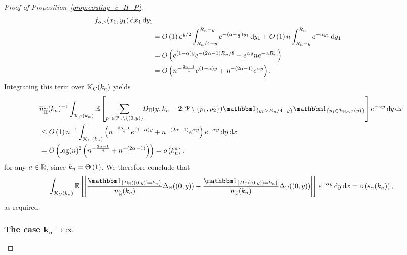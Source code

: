 \begin{proof}[Proof of Proposition~\ref{prop:couling_c_H_P}]
\begin{align*}
		f_{\alpha,\nu}(x_1, y_1) \operatorname{\mathrm{d}\hspace{-2pt}} x_1 \operatorname{\mathrm{d}\hspace{-2pt}} y_1\\
	&= O\left(1\right) e^{y/2} \int_{R_n/4 - y}^{R_n - y} e^{-(\alpha - \frac{1}{2})y_1} \operatorname{\mathrm{d}\hspace{-2pt}} y_1
		+ O\left(1\right) n \int_{R_n - y}^{R_n} e^{-\alpha y_1} \operatorname{\mathrm{d}\hspace{-2pt}} y_1\\
	&= O\left(e^{(1 - \alpha)y} e^{-(2\alpha - 1) R_n/8} + e^{\alpha y} n e^{-\alpha R_n}\right)\\
	&= O\left(n^{-\frac{2\alpha - 1}{4}} e^{(1 - \alpha)y} + n^{-(2\alpha - 1)} e^{\alpha y}\right).
\end{align*}
Integrating this term over ${\mathcal K}_C(k_n)$ yields
\begin{align*}
	&\expH^{-1} \int_{\Kcal_C(k_n)} \Exp{\sum_{p_1 \in \Pcal_n \setminus \{(0,y)\}} \hspace{-3pt} 
		D_{\H}(y,k_n-2;\Pcal \setminus \{p_1,p_2\}) \ind{y_1 > R_n/4 - y} \ind{p_1 \in \BallSym{y}}} 
		e^{-\alpha y} \dd y \dd x \\
	&\le \bigO{1} n^{-1} \int_{\Kcal_C(k_n)} 
		\left(n^{-\frac{2\alpha - 1}{4}} e^{(1 - \alpha)y} + n^{-(2\alpha - 1)} e^{\alpha y}\right) 
		e^{-\alpha y} \dd y \dd x\\
	&= \bigO{\log(n)^2\left(n^{-\frac{2\alpha - 1}{4}} + n^{-(2\alpha - 1)}\right)} = \smallO{k_n^a},
\end{align*}
for any $a \in {\ensuremath{\mathbb R}}$, since $k_n = \Theta\left(1\right)$. We therefore conclude that
\[
	\int_{\Kcal_{C}(k_n)} \Exp{\left|\frac{\ind{D_\H((0,y)) = k_n}}{\expH} \Delta_\H ((0,y) ) 
		- \frac{\ind{D_\Pcal((0,y)) = k_n}}{\expH} \Delta_\Pcal ((0,y))\right|} e^{-\alpha y} \dd y \dd x
	= \smallO{s_\alpha(k_n)},
\]
as required.

\subsubsection*{The case $\bm{k_n \to \infty}$}


\end{proof}
